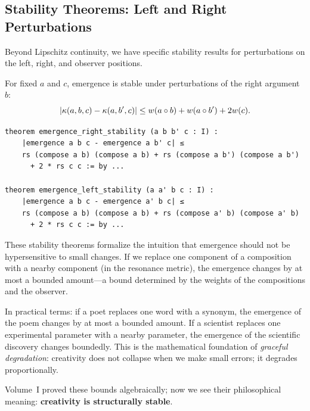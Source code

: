 \subsection{Stability Theorems: Left and Right Perturbations}

Beyond Lipschitz continuity, we have specific stability results for
perturbations on the left, right, and observer positions.

\begin{theorem}
\label{thm:emergence-right-stability}
For fixed $a$ and $c$, emergence is stable under perturbations of the right
argument $b$:
\[
  |\kappa(a, b, c) - \kappa(a, b', c)| \leq w(a \circ b) + w(a \circ b') + 2w(c).
\]
\end{theorem}

\begin{lstlisting}[caption={Stability theorems (IDT\_v3\_Emergence.lean)}]
theorem emergence_right_stability (a b b' c : I) :
    |emergence a b c - emergence a b' c| ≤
    rs (compose a b) (compose a b) + rs (compose a b') (compose a b')
      + 2 * rs c c := by ...

theorem emergence_left_stability (a a' b c : I) :
    |emergence a b c - emergence a' b c| ≤
    rs (compose a b) (compose a b) + rs (compose a' b) (compose a' b)
      + 2 * rs c c := by ...
\end{lstlisting}

\begin{interpretation}
These stability theorems formalize the intuition that emergence should not be
hypersensitive to small changes. If we replace one component of a composition
with a nearby component (in the resonance metric), the emergence changes by
at most a bounded amount---a bound determined by the weights of the
compositions and the observer.

In practical terms: if a poet replaces one word with a synonym, the
emergence of the poem changes by at most a bounded amount. If a scientist
replaces one experimental parameter with a nearby parameter, the emergence of
the scientific discovery changes boundedly. This is the mathematical
foundation of \emph{graceful degradation}: creativity does not collapse when
we make small errors; it degrades proportionally.

Volume~I proved these bounds algebraically; now we see their philosophical
meaning: \textbf{creativity is structurally stable}.
\end{interpretation}

